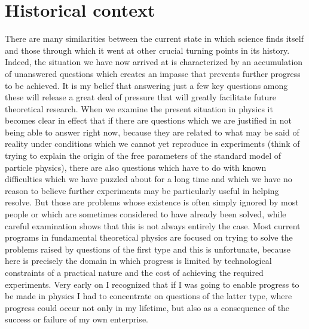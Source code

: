 \documentclass[notitlepage,12pt]{report}
\begin{document}
\section{Historical context}

There are many similarities between the current state in which science finds itself and those through which it went at other crucial turning points in its history. Indeed, the situation we have now arrived at is characterized by an accumulation of unanswered questions which creates an impasse that prevents further progress to be achieved. It is my belief that answering just a few key questions among these will release a great deal of pressure that will greatly facilitate future theoretical research. When we examine the present situation in physics it becomes clear in effect that if there are questions which we are justified in not being able to answer right now, because they are related to what may be said of reality under conditions which we cannot yet reproduce in experiments (think of trying to explain the origin of the free parameters of the standard model of particle physics), there are also questions which have to do with known difficulties which we have puzzled about for a long time and which we have no reason to believe further experiments may be particularly useful in helping resolve. But those are problems whose existence is often simply ignored by most people or which are sometimes considered to have already been solved, while careful examination shows that this is not always entirely the case. Most current programs in fundamental theoretical physics are focused on trying to solve the problems raised by questions of the first type and this is unfortunate, because here is precisely the domain in which progress is limited by technological constraints of a practical nature and the cost of achieving the required experiments. Very early on I recognized that if I was going to enable progress to be made in physics I had to concentrate on questions of the latter type, where progress could occur not only in my lifetime, but also as a consequence of the success or failure of my own enterprise.
\end{document}
